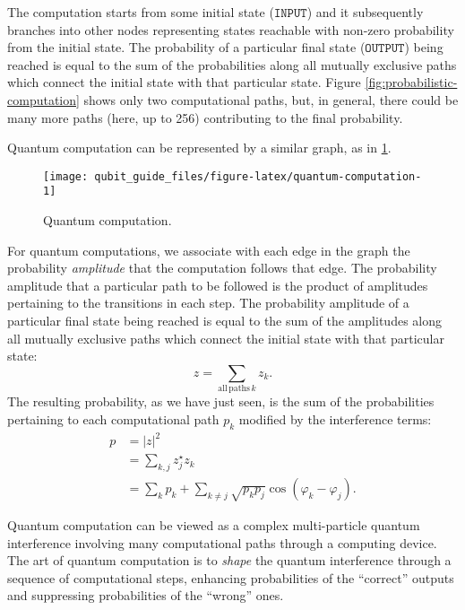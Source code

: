 \documentclass[fleqn]{article}
\newenvironment{idea}{\noindent}{\medskip}
\begin{document}
The computation starts from some initial state (\(\texttt{INPUT}\)) and it subsequently branches into other nodes representing states reachable with non-zero probability from the initial state.
The probability of a particular final state (\(\texttt{OUTPUT}\)) being reached is equal to the sum of the probabilities along all mutually exclusive paths which connect the initial state with that particular state.
Figure \ref{fig:probabilistic-computation} shows only two computational paths, but, in general, there could be many more paths (here, up to 256) contributing to the final probability.

Quantum computation can be represented by a similar graph, as in \ref{fig:quantum-computation}.

\begin{figure}[H]

{\centering \texttt{[image: qubit\_guide\_files/figure-latex/quantum-computation-1]} 

}

\caption{Quantum computation.}\label{fig:quantum-computation}
\end{figure}

For quantum computations, we associate with each edge in the graph the probability \emph{amplitude} that the computation follows that edge.
The probability amplitude that a particular path to be followed is the product of amplitudes pertaining to the transitions in each step.
The probability amplitude of a particular final state being reached is equal to the sum of the amplitudes along all mutually exclusive paths which connect the initial state with that particular state:
\[
  z = \sum_{\mathrm{all\,paths}\,k} z_k.
\]
The resulting probability, as we have just seen, is the sum of the probabilities pertaining to each computational path \(p_k\) modified by the interference terms:
\[
  \begin{aligned}
    p
    &= |z|^2
  \\&= \sum_{k,j} z_j^\star z_k
  \\&= \sum_k p_k + \sum_{k\ne j} \sqrt{p_k p_j}\cos(\varphi_k-\varphi_j).
  \end{aligned}
\]

\begin{idea}
Quantum computation can be viewed as a complex multi-particle quantum interference involving many computational paths through a computing device.
The art of quantum computation is to \emph{shape} the quantum interference through a sequence of computational steps, enhancing probabilities of the ``correct'' outputs and suppressing probabilities of the ``wrong'' ones.

\end{idea}
\end{document}
